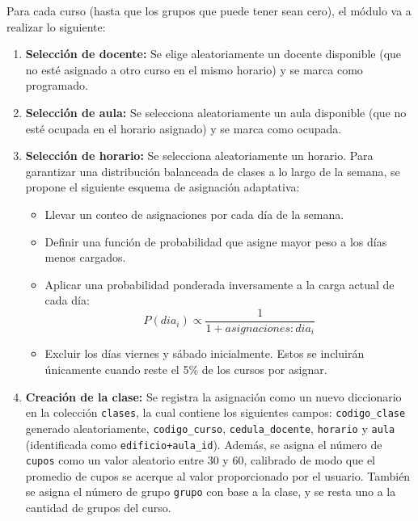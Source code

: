 \documentclass{article}
\begin{document}
Para cada curso (hasta que los grupos que puede tener sean cero), 
el módulo va a realizar lo siguiente:

\begin{enumerate}
  \item \textbf{Selección de docente:} Se elige aleatoriamente un docente disponible 
        (que no esté asignado a otro curso en el mismo horario) y se marca como programado.
  
  \item \textbf{Selección de aula:} Se selecciona aleatoriamente un aula disponible 
        (que no esté ocupada en el horario asignado) y se marca como ocupada.

  \item \textbf{Selección de horario:} Se selecciona aleatoriamente un horario. Para garantizar 
        una distribución balanceada de clases a lo largo de la semana, se propone el siguiente 
        esquema de asignación adaptativa:

  \begin{itemize}
    \item Llevar un conteo de asignaciones por cada día de la semana.
    \item Definir una función de probabilidad que asigne mayor peso a los días menos cargados.
    \item Aplicar una probabilidad ponderada inversamente a la carga actual de cada día:
      $$
      P(dia_{i}) \propto \frac{1}{1 + asignaciones:dia_{i}}
      $$
    \item Excluir los días viernes y sábado inicialmente. Estos se incluirán únicamente cuando 
          reste el 5\% de los cursos por asignar.
  \end{itemize}

  \item \textbf{Creación de la clase:} Se registra la asignación como un nuevo diccionario en 
        la colección \texttt{clases}, la cual contiene los siguientes campos: 
        \texttt{codigo\_clase} generado aleatoriamente, \texttt{codigo\_curso}, 
        \texttt{cedula\_docente}, 
        \texttt{horario} y \texttt{aula} (identificada como \texttt{edificio+aula\_id}).
        Además, se asigna el número de \texttt{cupos} como un valor aleatorio entre 30 y 60, 
        calibrado de modo que el promedio de cupos se acerque al valor proporcionado por el usuario.
        También se asigna el número de grupo \texttt{grupo} con base a la clase, y se resta uno 
        a la cantidad de
        grupos del curso.
        

\end{enumerate}
\end{document}
